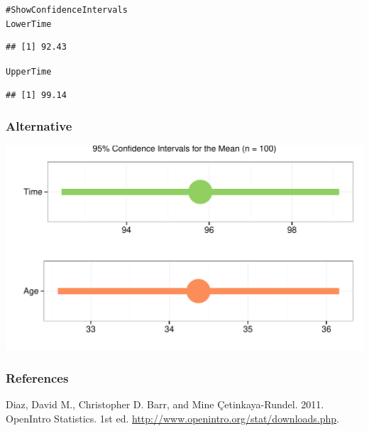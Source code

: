 \documentclass{beamer}\usepackage{graphicx, color}
\makeatletter
\def\maxwidth{ %
  \ifdim\Gin@nat@width>\linewidth
    \linewidth
  \else
    \Gin@nat@width
  \fi
}
\newcommand{\hlcomment}[1]{\textcolor[rgb]{0.180392156862745,0.6,0.341176470588235}{#1}}%
\newenvironment{kframe}{%
 \def\at@end@of@kframe{}%
 \ifinner\ifhmode%
  \def\at@end@of@kframe{\end{minipage}}%
  \begin{minipage}{\columnwidth}%
 \fi\fi%
 \def\FrameCommand##1{\hskip\@totalleftmargin \hskip-\fboxsep
 \colorbox{shadecolor}{##1}\hskip-\fboxsep
     \hskip-\linewidth \hskip-\@totalleftmargin \hskip\columnwidth}%
 \MakeFramed {\advance\hsize-\width
   \@totalleftmargin\z@ \linewidth\hsize
   \@setminipage}}%
 {\par\unskip\endMakeFramed%
 \at@end@of@kframe}
\newenvironment{knitrout}{}{} %
\makeatother
\begin{document}
\begin{frame}[fragile]
\begin{knitrout}
\color{fgcolor}\begin{kframe}
\begin{alltt}
\hlcomment{# Show Confidence Intervals}
LowerTime
\end{alltt}
\begin{verbatim}
## [1] 92.43
\end{verbatim}
\begin{alltt}

UpperTime
\end{alltt}
\begin{verbatim}
## [1] 99.14
\end{verbatim}
\end{kframe}
\end{knitrout}




\end{frame}


\begin{frame}[fragile]
  \frametitle{Alternative}



\begin{knitrout}
\color{fgcolor}

{\centering \includegraphics[width=\maxwidth]{figure/ConfIntPlot} 

}


\end{knitrout}

\end{frame}


\begin{frame}[allowframebreaks]
  \frametitle{References}
  Diaz, David M., Christopher D. Barr, and Mine \c{C}etinkaya-Rundel. 2011. OpenIntro Statistics. 1st ed. \url{http://www.openintro.org/stat/downloads.php}. \\[0.25cm] 
\end{frame}
\end{document}
